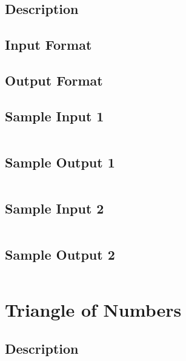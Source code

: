 \subsection*{Description}

\subsection*{Input Format}

\subsection*{Output Format}

\subsection*{Sample Input 1}
\begin{verbatim}
\end{verbatim}

\subsection*{Sample Output 1}
\begin{verbatim}
\end{verbatim}

\subsection*{Sample Input 2}
\begin{verbatim}
\end{verbatim}

\subsection*{Sample Output 2}
\begin{verbatim}
\end{verbatim}


\newpage



\section{Triangle of Numbers}

\subsection*{Description}

